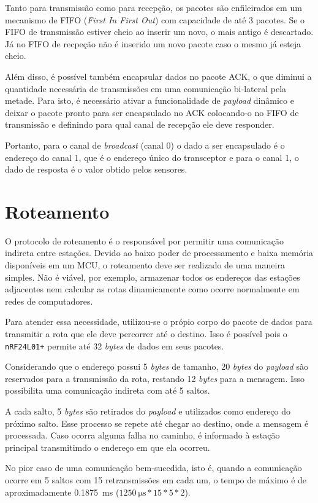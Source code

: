 {Tanto para transmissão como para recepção, os pacotes são enfileirados em um mecanismo de FIFO (\textit{First
In First Out}) com capacidade de até 3 pacotes. Se o FIFO de transmissão estiver cheio ao inserir um novo, o
mais antigo é descartado. Já no FIFO de recpeção não é inserido um novo pacote caso o mesmo já esteja cheio.

Além disso, é possível também encapsular dados no pacote ACK, o que diminui a quantidade necessária de
transmissões em uma comunicação bi-lateral pela metade. Para isto, é necessário ativar a funcionalidade de
\textit{payload} dinâmico e deixar o pacote pronto para ser encapsulado no ACK colocando-o no FIFO de
transmissão e definindo para qual canal de recepção ele deve responder.

Portanto, para o canal de \textit{broadcast} (canal 0) o dado a ser encapsulado é o endereço do canal 1, que é o
endereço único do transceptor e para o canal 1, o dado de resposta é o valor obtido pelos sensores.

\section{Roteamento}
O protocolo de roteamento é o responsável por permitir uma comunicação indireta entre estações. Devido ao
baixo poder de processamento e baixa memória disponíveis em um MCU, o roteamento deve ser realizado de uma
maneira simples. Não é viável, por exemplo, armazenar todos os endereços das estações adjacentes nem
calcular as rotas dinamicamente como ocorre normalmente em redes de computadores.

Para atender essa necessidade, utilizou-se o própio corpo do pacote de dados para transmitir a rota
que ele deve percorrer até o destino. Isso é possível pois o \texttt{nRF24L01+} permite até 32
\textit{bytes} de dados em seus pacotes.

Considerando que o endereço possui 5 \textit{bytes} de tamanho, 20 \textit{bytes} do \textit{payload} são
reservados para a transmissão da rota, restando 12 \textit{bytes} para a mensagem. Isso possibilita uma
comunicação indireta com até 5 saltos.

A cada salto, 5 \textit{bytes} são retirados do \textit{payload} e utilizados como endereço do próximo salto.
Esse processo se repete até chegar ao destino, onde a mensagem é processada. Caso ocorra alguma falha no
caminho, é informado à estação principal transmitimdo o endereço em que ela ocorreu.

No pior caso de uma comunicação bem-sucedida, isto é, quando a comunicação ocorre em 5 saltos com 15
retransmissões em cada um, o tempo de máximo é de aproximadamente \SI{0.1875}{\milli \second}
($\SI{1250}{\micro \second} * 15 * 5 * 2$).

}
